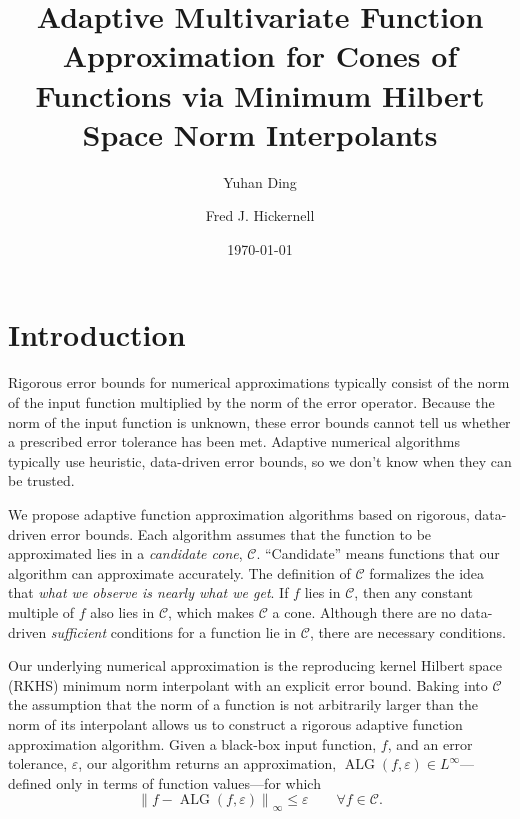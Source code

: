 \documentclass[]{mcom-l}
\title[Adaptive Multivariate Function Approximation]{Adaptive Multivariate Function Approximation for Cones of Functions via Minimum Hilbert Space Norm Interpolants}
\author{Yuhan Ding}
\author{Fred J. Hickernell}
\date{\today}
\theoremstyle{theorem}
\theoremstyle{remark}
\DeclareMathOperator{\ALG}{ALG}
\newcommand{\cc}{\mathcal{C}}
\newcommand{\calc}{{\mathcal{C}}}
\newcommand{\norm}[2][{}]{\ensuremath{\left \lVert #2 \right \rVert}_{#1}}
\begin{document}
\maketitle

\section{Introduction}
Rigorous error bounds for numerical approximations typically consist of the norm of the input function multiplied by the norm of the error operator.  Because the norm of the input function is unknown, these error bounds cannot tell us whether a prescribed error tolerance has been met.  Adaptive numerical algorithms typically use heuristic, data-driven error bounds,  so we don't know when they can be trusted.

We propose  adaptive function approximation algorithms based on rigorous, data-driven error bounds.  Each algorithm assumes that the function to be approximated lies in a \emph{candidate cone}, $\cc$.  ``Candidate'' means functions that our algorithm can approximate accurately.  The definition of $\cc$ formalizes the idea that \emph{what we observe is nearly what we get}.  If $f$ lies in $\cc$, then any constant multiple of $f$  also lies in $\cc$, which makes $\cc$ a cone.  Although there are no data-driven \emph{sufficient} conditions for a function lie in $\calc$, there are necessary conditions.

Our underlying numerical approximation is the reproducing kernel Hilbert space (RKHS) minimum norm interpolant with an explicit error bound.  Baking into $\cc$ the assumption that the norm of a function is not arbitrarily larger than the norm of its interpolant allows us to construct a rigorous adaptive function approximation algorithm. Given a black-box input function, $f$, and an error tolerance, $\varepsilon$, our algorithm returns an approximation, $\ALG(f,\varepsilon) \in L^\infty$---defined only in terms of function values---for which 
\begin{equation} \label{eq:errorcrit}
\norm[\infty]{f - \ALG(f,\varepsilon)} \le \varepsilon \qquad \forall f\in \cc.
\end{equation}
\end{document}
